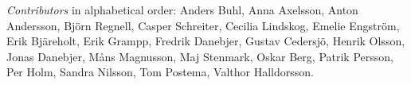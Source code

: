 \emph{Contributors} in alphabetical order:
Anders Buhl,
Anna Axelsson,
Anton Andersson,
Björn Regnell,
Casper Schreiter,
Cecilia Lindskog,
Emelie Engström,
Erik Bjäreholt,
Erik Grampp,
Fredrik Danebjer,
Gustav Cedersjö,
Henrik Olsson,
Jonas Danebjer, 
Måns Magnusson,
Maj Stenmark,
Oskar Berg,
Patrik Persson,
Per Holm,
Sandra Nilsson,
Tom Postema,
Valthor Halldorsson. 
